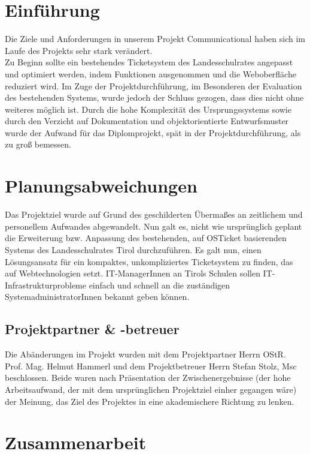 \renewcommand{\currentAuthor}{Das Projektteam}
	\section{Einführung}
	Die Ziele und Anforderungen in unserem Projekt Communicational haben sich im Laufe des Projekts sehr stark verändert.
	\\
	Zu Beginn sollte ein bestehendes Ticketsystem des Landesschulrates angepasst und optimiert werden, indem Funktionen ausgenommen und die Weboberfläche reduziert wird. Im Zuge der Projektdurchführung, im Besonderen der Evaluation des bestehenden Systems, wurde jedoch der Schluss gezogen, dass dies nicht ohne weiteres möglich ist. Durch die hohe Komplexität des Ursprungssystems sowie durch den Verzicht auf Dokumentation und objektorientierte Entwurfsmuster wurde der Aufwand für das Diplomprojekt, spät in der Projektdurchführung, als zu groß bemessen.
	
	\section{Planungsabweichungen}
	Das Projektziel wurde auf Grund des geschilderten Übermaßes an zeitlichem und personellem Aufwandes abgewandelt. Nun galt es, nicht wie ursprünglich geplant die Erweiterung bzw. Anpassung des bestehenden, auf OSTicket basierenden Systems des Landesschulrates Tirol durchzuführen. Es galt nun, einen Lösungsansatz für ein kompaktes, unkompliziertes Ticketsystem zu finden, das auf Webtechnologien setzt. IT-ManagerInnen an Tirols Schulen sollen IT-Infrastrukturprobleme einfach und schnell an die zuständigen SystemadministratorInnen bekannt geben können.
	
	\subsection{Projektpartner \& -betreuer}
	Die Abänderungen im Projekt wurden mit dem Projektpartner Herrn OStR. Prof. Mag. Helmut Hammerl und dem Projektbetreuer Herrn Stefan Stolz, Msc beschlossen. Beide waren nach Präsentation der Zwischenergebnisse (der hohe Arbeitsaufwand, der mit dem ursprünglichen Projektziel einher gegangen wäre) der Meinung, das Ziel des Projektes in eine akademischere Richtung zu lenken.
	
	\section{Zusammenarbeit}
